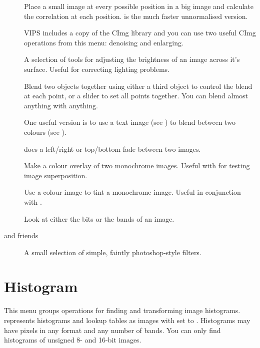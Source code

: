 \begin{description}
\item[]
	Place a small image at every possible position in a big image and
	calculate the correlation at each position.  is
	the much faster unnormalised version.

\item[]
	VIPS includes a copy of the CImg library and you can use two useful
	CImg operations from this menu: denoising and enlarging.

\item[]
	A selection of tools for adjusting the brightness of an image across
	it's surface. Useful for correcting lighting problems.

\item[]
	Blend two objects together using either a third object to control the
	blend at each point, or a slider to set all points together. You can
	blend almost anything with anything.

	One useful version is to use a text image (see ) to blend between two colours (see
	).

	 does a left/right or top/bottom fade between two
	images.

\item[]
	Make a colour overlay of two monochrome images. Useful with
	 for testing image superposition.

\item[]
	Use a colour image to tint a monochrome image. Useful in conjunction
	with .

\item[]
	Look at either the bits or the bands of an image.

\item[ and friends]
	A small selection of simple, faintly photoshop-style filters. 

\end{description}

\section{Histogram}

This menu groups operations for finding and transforming image histograms.
\nip{} represents histograms and lookup tables as images with 
set to .  Histograms may have pixels in any format and any
number of bands. You can only find histograms of unsigned 8- and 16-bit
images.

